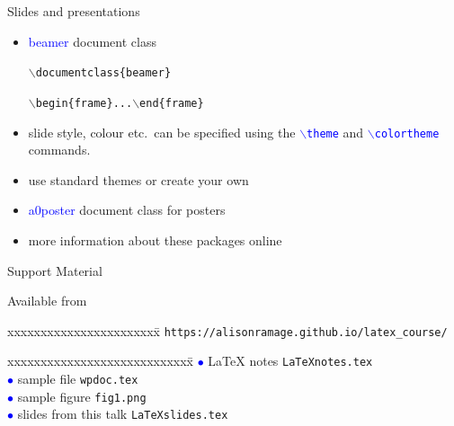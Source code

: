 \documentclass{beamer}
\newcommand{\bc}{\begin{center}}
\newcommand{\ec}{\end{center}}
\newcommand{\lx}{{\LaTeX} }
\newcommand{\bs}{$\backslash$}
\def\mynormal{\vspace*{-0.5cm}}
\begin{document}
\begin{frame}{Slides and presentations}
\mynormal
\medskip
\begin{itemize}
\item \textcolor{blue}{beamer} document class
\bc
{\tt \bs documentclass\{beamer\} }
\ec
\bc
{\tt \bs begin\{frame\}...\bs end\{frame\}}
\ec
\pause
\medskip
\item slide style, colour etc.\ 
can be specified using the \textcolor{blue}{\texttt{\bs theme}} and 
\textcolor{blue}{\texttt{\bs colortheme}} commands. 
\medskip
\item use standard themes or create your own
\medskip
\item \textcolor{blue}{a0poster} document class for posters
\medskip
\item more information about these packages online
\end{itemize}
\end{frame}
\begin{frame}{Support Material}

Available from\\

\bigskip

\begin{tabbing}
xxxxxxxxxxxxxxxxxxxxxxx\= \kill
\texttt{https://alisonramage.github.io/latex\_course/}
\end{tabbing}

\bigskip
\bigskip
\bigskip

\begin{tabbing}
xxxxxxxxxxxxxxxxxxxxxxxxxxxx\= \kill
\textcolor{blue}{$\bullet$} \lx notes \>  
\texttt{LaTeXnotes.tex}\\
\textcolor{blue}{$\bullet$} sample file \>  
\texttt{wpdoc.tex}\\
\textcolor{blue}{$\bullet$} sample figure \>  
\texttt{fig1.png}\\
\textcolor{blue}{$\bullet$} slides from this talk \>  
\texttt{LaTeXslides.tex}\\
\end{tabbing}
\begin{flushright}
\end{flushright}

\end{frame}
\end{document}
